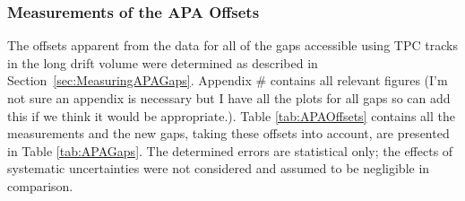 \subsubsection{Measurements of the APA Offsets}\label{sec:APAOffsetMeasurements}

The offsets apparent from the data for all of the gaps accessible using TPC tracks in the long drift volume were determined as described in Section~\ref{sec:MeasuringAPAGaps}.  Appendix \# contains all relevant figures {\color{red}(I'm not sure an appendix is necessary but I have all the plots for all gaps so can add this if we think it would be appropriate.)}.  Table \ref{tab:APAOffsets} contains all the measurements and the new gaps, taking these offsets into account, are presented in Table \ref{tab:APAGaps}.  The determined errors are statistical only; the effects of systematic uncertainties were not considered and assumed to be negligible in comparison.


